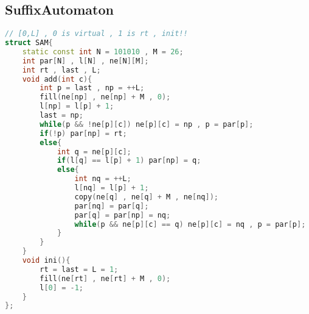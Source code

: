 \subsection{SuffixAutomaton}
\begin{lstlisting}[language=C++]
// [0,L] , 0 is virtual , 1 is rt , init!!
struct SAM{
    static const int N = 101010 , M = 26;
    int par[N] , l[N] , ne[N][M];
    int rt , last , L;
    void add(int c){
        int p = last , np = ++L;
        fill(ne[np] , ne[np] + M , 0);
        l[np] = l[p] + 1;
        last = np;
        while(p && !ne[p][c]) ne[p][c] = np , p = par[p];
        if(!p) par[np] = rt;
        else{
            int q = ne[p][c];
            if(l[q] == l[p] + 1) par[np] = q;
            else{
                int nq = ++L;
                l[nq] = l[p] + 1;
                copy(ne[q] , ne[q] + M , ne[nq]);
                par[nq] = par[q];
                par[q] = par[np] = nq;
                while(p && ne[p][c] == q) ne[p][c] = nq , p = par[p];
            }
        }
    }
    void ini(){
        rt = last = L = 1;
        fill(ne[rt] , ne[rt] + M , 0);
        l[0] = -1;
    }
};
\end{lstlisting}
